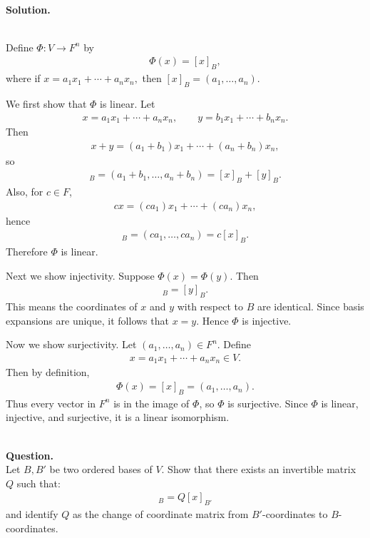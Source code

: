 \documentclass{article}
\begin{document}
\noindent\\
\textbf{Solution.}\\
\quad\\
\begin{mdframed}[linewidth=1pt]
Define $\Phi:V\to F^n$ by
\begin{align*}
\Phi(x)=[x]_B,
\end{align*}
where if $x=a_1x_1+\cdots+a_nx_n,$ then $[x]_B=(a_1,\dots,a_n).$

We first show that $\Phi$ is linear. Let
\begin{align*}
x=a_1x_1+\cdots+a_nx_n,\qquad y=b_1x_1+\cdots+b_nx_n.
\end{align*}
Then
\begin{align*}
x+y=(a_1+b_1)x_1+\cdots+(a_n+b_n)x_n,
\end{align*}
so
\begin{align*}
[x+y]_B=(a_1+b_1,\dots,a_n+b_n)=[x]_B+[y]_B.
\end{align*}
Also, for $c\in F$,
\begin{align*}
cx=(ca_1)x_1+\cdots+(ca_n)x_n,
\end{align*}
hence
\begin{align*}
[cx]_B=(ca_1,\dots,ca_n)=c[x]_B.
\end{align*}
Therefore $\Phi$ is linear.

Next we show injectivity. Suppose $\Phi(x)=\Phi(y)$. Then
\begin{align*}
[x]_B=[y]_B.
\end{align*}
This means the coordinates of $x$ and $y$ with respect to $B$ are identical. Since basis expansions are unique, it follows that $x=y$. Hence $\Phi$ is injective.

Now we show surjectivity. Let $(a_1,\dots,a_n)\in F^n$. Define
\begin{align*}
x=a_1x_1+\cdots+a_nx_n\in V.
\end{align*}
Then by definition,
\begin{align*}
\Phi(x)=[x]_B=(a_1,\dots,a_n).
\end{align*}
Thus every vector in $F^n$ is in the image of $\Phi$, so $\Phi$ is surjective.
Since $\Phi$ is linear, injective, and surjective, it is a linear isomorphism.
\end{mdframed}

\bigskip

\hfill \break  $~\!\!$ \dotfill \medskip \\
\textbf{Question.}\\
Let $B, B'$ be two ordered bases of $V$. Show that there exists an invertible matrix $Q$ such that:
\begin{align*}
[x]_{B} = Q [x]_{B'}
\end{align*}
and identify $Q$ as the change of coordinate matrix from $B'$-coordinates to $B$-coordinates.
\end{document}
